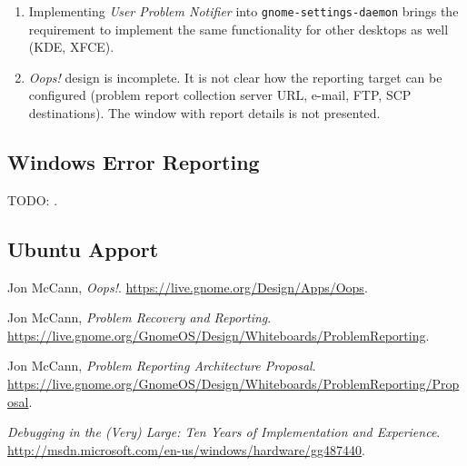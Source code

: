 \documentclass{article}
\begin{document}
\begin{enumerate}
\item Implementing \emph{User Problem Notifier} into
  \texttt{gnome-settings-daemon} brings the requirement to implement
  the same functionality for other desktops as well (KDE, XFCE).
\item \emph{Oops!} design is incomplete. It is not clear how the
  reporting target can be configured (problem report collection server
  URL, e-mail, FTP, SCP destinations).  The window with report details
  is not presented.
\end{enumerate}

\subsection{Windows Error Reporting}
TODO: \cite{MS}.

\subsection{Ubuntu Apport}


\cleardoublepage
\begin{thebibliography}{9}

  Jon McCann,
  \emph{Oops!}.
  \url{https://live.gnome.org/Design/Apps/Oops}.

  Jon McCann,
  \emph{Problem Recovery and Reporting}.
  \url{https://live.gnome.org/GnomeOS/Design/Whiteboards/ProblemReporting}.

  Jon McCann,
  \emph{Problem Reporting Architecture Proposal}.
  \url{https://live.gnome.org/GnomeOS/Design/Whiteboards/ProblemReporting/Proposal}.

  \emph{Debugging in the (Very) Large: Ten Years of Implementation and Experience}.
  \url{http://msdn.microsoft.com/en-us/windows/hardware/gg487440}.

\end{thebibliography}
\end{document}
